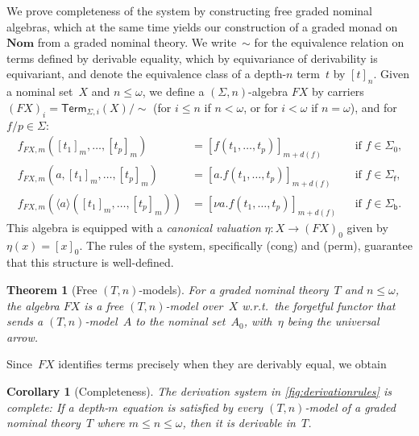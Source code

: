 \documentclass[11pt,a4paper]{amsart}
\newtheorem{theorem}{Theorem}[section]
\newtheorem{corollary}[corollary]{Corollary}
\newcommand{\Term}{\mathsf{Term}}
\newcommand{\sig}{\Sigma}
\newcommand{\sigp}{\Sigma_0}
\newcommand{\sigf}{\Sigma_{\mathsf f}}
\newcommand{\sigb}{\Sigma_{\mathsf b}}
\newcommand{\bind}[1]{\langle #1\rangle}
\theoremstyle{plain}
\numberwithin{equation}{section}
\newcommand{\+}[1]{\mathcal{#1}\xspace}
\newcommand{\Nom}{\mathbf{Nom}}
\theoremstyle{definition}
\begin{document}
\noindent We prove completeness of the system by constructing free
graded nominal algebras, which at the same time yields our
construction of a graded monad on $\Nom$ from a graded nominal
theory. We write~$\sim$ for the equivalence relation on terms defined
by derivable equality, which by equivariance of derivability
is equivariant, and denote
the equivalence class of a depth-$n$ term~$t$ by $[t]_n$. Given a
nominal set~$X$ and $n\le\omega$, we define a $(\Sigma,n)$-algebra
$FX$ by carriers $(FX)_i = \Term_{\sig, i}(X)/{\sim}$ (for $i \le n$
if $n<\omega$, or for $i<\omega$ if $n=\omega$), and for
$f/p \in \Sigma$:
\begin{align*}
  f_{FX, m}([t_1]_m, \ldots, [t_p]_m) &= [f(t_1, \ldots, t_p)]_{m + d(f)} && \text{if $f \in \sigp$,} \\
  f_{FX, m}(a, [t_1]_m, \ldots, [t_p]_m) &= [a.f(t_1, \ldots, t_p)]_{m + d(f)} && \text{if $f \in \sigf$,} \\
  f_{FX, m}(\bind{a} ([t_1]_m, \ldots, [t_p]_m)) &= [\nu a.f(t_1, \ldots, t_p)]_{m + d(f)} && \text{if $f \in \sigb$.}
\end{align*}
This algebra is equipped with a \emph{canonical valuation}
$\eta\colon X\to (FX)_0$ given by $\eta(x)=[x]_0$. The rules of the
system, specifically (cong) and (perm), guarantee that this structure
is well-defined.
\begin{theorem}[Free $(T,n)$-models]\label{thm:free}
  For a graded nominal theory~$T$ and $n\le\omega$, the algebra $FX$
  is a free $(T,n)$-model over~$X$ w.r.t.\ the forgetful functor that
  sends a $(T,n)$-model~$A$ to the nominal set~$A_0$, with~$\eta$
  being the universal arrow.
\end{theorem}
\noindent Since~$FX$ identifies terms precisely when they are derivably
equal, we obtain
\begin{corollary}[Completeness]
  The derivation system in \cref{fig:derivationrules} is complete:
  If a depth-$m$ equation is satisfied by every \((T, n)\)-model of a
  graded nominal theory~$T$ where $m\le n\le\omega$, then it is
  derivable in~$T$.
\end{corollary}
\end{document}
